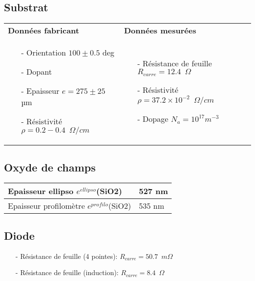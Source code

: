 \documentclass[11pt]{article}
\begin{document}
\subsection{Substrat}
\begin{center}
    \noindent \begin{tabular}[!htb]{ | p{7cm} | p{7cm} |}
    \hline
    \textbf{Donn\'ees fabricant} & \textbf{Donn\'ees mesur\'ees} \\
    \begin{itemize}
    	\item[-] Orientation $100 \pm 0.5$ deg
    	\item[-] Dopant
    	\item[-] Epaisseur $e = 275 \pm 25$ µm
    	\item[-] R\'esistivit\'e $\rho = 0.2 - 0.4 \phantom{2} \Omega/cm$
    \end{itemize}
     &
	\begin{itemize}
    	\item[-] R\'esistance de feuille
    		$R_{carre} = 12.4 \phantom{2} \Omega$
    	\item[-] R\'esistivit\'e $\rho = 37.2 \times 10^{-2}  \phantom{2} \Omega/cm$
    	\item[-] Dopage      $N_a = 10^{17} m^{-3}$
    \end{itemize}
    \\
    \hline
    \end{tabular}
\end{center}

\subsection{Oxyde de champs}
	
	\begin{center}
    \noindent \begin{tabular}[!htb]{ | p{7cm} | p{7cm} | }
    \hline
    Epaisseur ellipso $e^{ellipso}$(SiO2) & 527 nm\\ \hline
    Epaisseur profilom\`etre    $e^{profilo}$(SiO2) & 535 nm \\ 
    \hline
    \end{tabular}
    \end{center}
 
\subsection{Diode}

\begin{itemize} \itemsep -2pt
\item[-] R\'esistance de feuille (4 pointes): $R_{carre} = 50.7 \phantom{2} m\Omega$
\item[-] R\'esistance de feuille (induction): $R_{carre} = 8.4 \phantom{2} \Omega$
\end{itemize}
\end{document}
